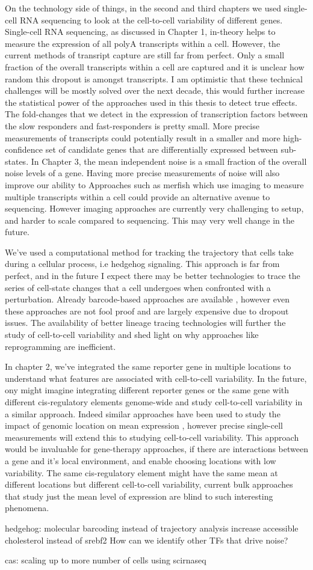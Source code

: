 On the technology side of things, in the second and third chapters we  used single-cell RNA sequencing to look at the cell-to-cell variability of different genes. Single-cell RNA sequencing, as discussed in Chapter 1, in-theory helps to measure the expression of all polyA transcripts within a cell. However, the current methods of transript capture are still far from perfect. Only a small fraction of the overall transcripts within a cell are captured \cite{pachter's postdoc} and it is unclear how random this dropout is amongst transcripts. I am optimistic that these technical challenges will be mostly solved over the next decade, this would further increase the statistical power of the approaches used in this thesis to detect true effects. The fold-changes that we detect in the expression of transcription factors between the slow responders and fast-responders is pretty small. More precise measurements of transcripts could potentially result in a smaller and more high-confidence set of candidate genes that are differentially expressed between sub-states. In Chapter 3, the mean independent noise is a small fraction of the overall noise levels of a gene. Having more precise measurements of noise will also improve our ability to Approaches such as merfish \cite{merfish} which use imaging to measure multiple transcripts within a cell could provide an alternative avenue to sequencing. However imaging approaches are currently very challenging to setup, and harder to scale compared to sequencing. This may very well change in the future.

We've used a computational method for tracking the trajectory that cells take during a cellular process, i.e hedgehog signaling. This approach is far from perfect, and in the future I expect there may be better technologies to trace the series of cell-state changes that a cell undergoes when confronted with a perturbation. Already barcode-based approaches are available \cite{morris lineaage tracing, arnav's paper}, however even these approaches are not fool proof and are largely expensive due to dropout issues. The availability of better lineage tracing technologies will further the study of cell-to-cell variability and shed light on why approaches like reprogramming are inefficient.

In chapter 2, we've integrated the same reporter gene in multiple locations to understand what features are associated with cell-to-cell variability. In the future, ony might imagine integrating different reporter genes or the same gene with different cis-regulatory elements genome-wide and study cell-to-cell variability in a similar approach. Indeed similar approaches have been used to study the impact of genomic location on mean expression \cite{claraice's papers}, however precise single-cell measurements will extend this to studying cell-to-cell variability. This approach would be invaluable for gene-therapy approaches, if there are interactions between a gene and it's local environment, and enable choosing locations with low variability. The same cis-regulatory element might have the same mean at different locations but different cell-to-cell variability, current bulk approaches that study just the mean level of expression are blind to such interesting phenomena.


hedgehog:
molecular barcoding instead of trajectory analysis
increase accessible cholesterol instead of srebf2
How can we identify other TFs that drive noise?



cas:
scaling up to more number of cells using scirnaseq


